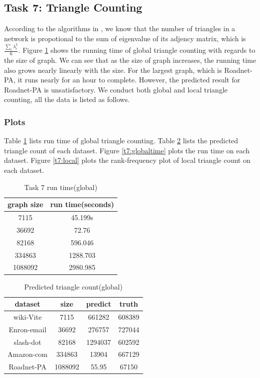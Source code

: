 \subsection{Task 7: Triangle Counting}
According to the algorithms in \cite{tsourakakis2008fast}, we know that the number of triangles in a network is propotional to the sum of eigenvalue of its adjency matrix, which is $\frac{\sum_{i}\lambda_{i}^{3}}{6}$. Figure \ref{t7:timedata} shows the running time of global triangle counting with regards to the size of graph. We can see that as the size of graph increases, the running time also grows nearly linearly with the size. For the largest graph, which is Roadnet-PA, it runs nearly for an hour to complete. However, the predicted result for Roadnet-PA is unsatisfactory. We conduct both global and local triangle counting, all the data is listed as follows.

\subsubsection{Plots}
Table \ref{t7:timedata} lists run time of global triangle counting. Table \ref{t7:globalpredict} lists the predicted triangle count of each dataset. Figure \ref{t7:globaltime} plots the run time on each dataset. Figure \ref{t7:local} plots the rank-frequency plot of local triangle count on each dataset. 

\begin{table}
\begin{center}
\begin{tabular}{ | c | c | }
    \hline
    graph size & run time(seconds) \\ \hline
    7115 & 45.199s \\ \hline
    36692 & 72.76 \\ \hline
    82168 & 596.046 \\ \hline
    334863 & 1288.703 \\ \hline
    1088092 & 2980.985 \\ \hline
\end{tabular}
\end{center}
\caption{Task 7 run time(global)}
\label{t7:timedata}
\end{table}

\begin{table}
\begin{center}
\begin{tabular} {| c | c | c | c | }
    \hline
    dataset & size & predict & truth \\ \hline
    wiki-Vite & 7115 & 661282 & 608389 \\ \hline
    Enron-email & 36692 & 276757 & 727044 \\ \hline
    slash-dot & 82168 & 1294037 & 602592 \\ \hline
    Amazon-com & 334863 & 13904 & 667129 \\ \hline
    Roadnet-PA & 1088092 & 55.95 & 67150 \\ \hline
\end{tabular}
\end{center}
\caption{Predicted triangle count(global)}
\label{t7:globalpredict}
\end{table}

